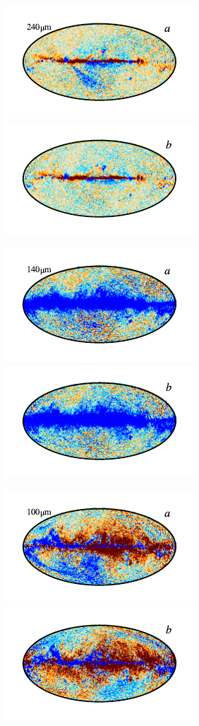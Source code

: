 \documentclass{aa}
\begin{document}
\begin{figure}
	\centering
	\includegraphics{figs/res_maps/res_10a_c0001_000019.pdf}\includegraphics{figs/res_maps/res_10b_c0001_000019.pdf}
  \vspace*{-0.85cm}

	\includegraphics{figs/res_maps/res_09a_c0001_000019.pdf}\includegraphics{figs/res_maps/res_09b_c0001_000019.pdf}
  \vspace*{-0.85cm}

	\includegraphics{figs/res_maps/res_08a_c0001_000019.pdf}\includegraphics{figs/res_maps/res_08b_c0001_000019.pdf}
  \vspace*{-0.85cm}


\end{figure}
\end{document}
